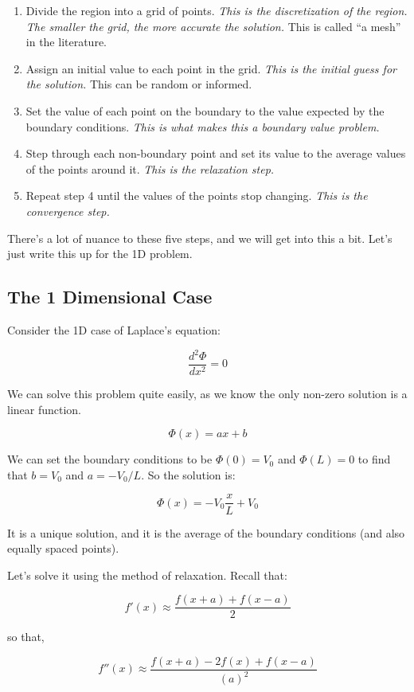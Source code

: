 \begin{enumerate}
\def\labelenumi{\arabic{enumi}.}
\tightlist
\item
  Divide the region into a grid of points. \emph{This is the
  discretization of the region. The smaller the grid, the more accurate
  the solution.} This is called ``a mesh'' in the literature.
\item
  Assign an initial value to each point in the grid. \emph{This is the
  initial guess for the solution.} This can be random or informed.
\item
  Set the value of each point on the boundary to the value expected by
  the boundary conditions. \emph{This is what makes this a boundary
  value problem.}
\item
  Step through each non-boundary point and set its value to the average
  values of the points around it. \emph{This is the relaxation step.}
\item
  Repeat step 4 until the values of the points stop changing. \emph{This
  is the convergence step.}
\end{enumerate}

There's a lot of nuance to these five steps, and we will get into this a
bit. Let's just write this up for the 1D problem.

\subsection{The 1 Dimensional Case}\label{the-1-dimensional-case}

Consider the 1D case of Laplace's equation:

\[\frac{d^2\Phi}{dx^2}=0\]

We can solve this problem quite easily, as we know the only non-zero
solution is a linear function.

\[\Phi(x)=ax+b\]

We can set the boundary conditions to be \(\Phi(0)=V_0\) and
\(\Phi(L)=0\) to find that \(b=V_0\) and \(a=-V_0/L\). So the solution
is:

\[\Phi(x)=-V_0\dfrac{x}{L}+V_0\]

It is a unique solution, and it is the average of the boundary
conditions (and also equally spaced points).

Let's solve it using the method of relaxation. Recall that:

\[f'(x)\approx \frac{f(x+a)+f(x-a)}{2}\]

so that,

\[f''(x)\approx \frac{f(x+a)-2f(x)+f(x-a)}{(a)^2}\]

